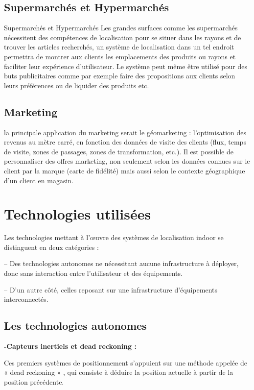 \documentclass[12pt,a4paper]{report}
\begin{document}
\subsection{Supermarchés et Hypermarchés}
Supermarchés et Hypermarchés
Les grandes surfaces comme les supermarchés nécessitent des compétences de localisation pour se situer dans les rayons et de trouver les articles recherchés, un système de localisation dans un tel endroit permettra de montrer aux clients les emplacements des produits ou rayons et faciliter leur expérience d’utilisateur.
Le système peut même être utilisé pour des buts publicitaires comme par exemple faire des propositions aux clients selon leurs préférences ou de liquider des produits etc.


\subsection{Marketing}

la principale application du marketing serait le géomarketing : l’optimisation des revenus au mètre carré, en fonction des données de visite des clients (flux, temps de visite, zones de passages, zones de transformation, etc.). Il est possible de personnaliser des offres marketing, non seulement selon les données connues sur le client par la marque (carte de fidélité) mais aussi selon le contexte géographique d’un client en magasin.


\section{Technologies utilisées}

Les technologies mettant à l’œuvre des systèmes de localisation indoor se distinguent en deux catégories :


– Des technologies autonomes ne nécessitant aucune infrastructure à déployer, donc sans interaction entre l’utilisateur et des équipements.


– D’un autre côté, celles reposant sur une infrastructure d’équipements interconnectés.

\subsection{Les technologies autonomes}

\textbf{-Capteurs inertiels et dead reckoning :}


	Ces premiers systèmes de positionnement s’appuient sur une méthode appelée de « dead reckoning »\cite{dead} , qui consiste à déduire la position actuelle à partir de la position précédente.
	
\end{document}
